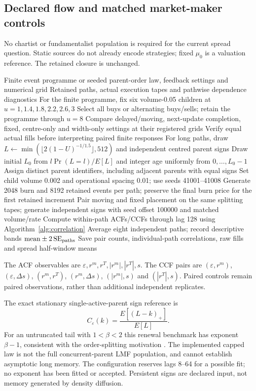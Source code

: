\documentclass[11pt,a4paper]{article}
\begin{document}
\subsection{Declared flow and matched market-maker controls}
No chartist or fundamentalist population is required for the current spread
question. Static sources do not already encode strategies; fixed $\mu_0$
is a valuation reference. The retained closure is unchanged.
\begin{algorithm}[H]
\caption{Declared input flow and common-tape feedback comparisons}\label{alg:controls}
\begin{algorithmic}[1]
\Require Finite event programme or seeded parent-order law, feedback settings and numerical grid
\Ensure Retained paths, actual execution tapes and pathwise dependence diagnostics
\State For the finite programme, fix six volume-0.05 children at $u=1,1.4,1.8,2.2,2.6,3$
\State Select all buys or alternating buys/sells; retain the programme through $u=8$
\State Compare delayed/moving, next-update completion, fixed, centre-only and width-only settings at their registered grids
\State Verify equal actual fills before interpreting paired finite responses
\State For long paths, draw $L\gets\min(\lfloor2(1-U)^{-1/1.5}\rfloor,512)$ and independent centred parent signs
\State Draw initial $L_0$ from $l\Pr(L=l)/E[L]$ and integer age uniformly from $0,\ldots,L_0-1$
\State Assign distinct parent identifiers, including adjacent parents with equal signs
\State Set child volume 0.002 and operational spacing 0.01; use seeds 41001--41008
\State Generate 2048 burn and 8192 retained events per path; preserve the final burn price for the first retained increment
\State Pair moving and fixed placement on the same splitting tapes; generate independent signs with seed offset 100000 and matched volume/rate
\State Compute within-path ACFs/CCFs through lag 128 using Algorithm~\ref{alg:correlation}
\State Average eight independent paths; record descriptive bands $\mathrm{mean}\pm2\,\mathrm{SE}_{\rm paths}$
\State Save pair counts, individual-path correlations, raw fills and spread half-window means
\end{algorithmic}
\end{algorithm}
The ACF observables are $\varepsilon,r^m,r^T,|r^m|,|r^T|,s$. The CCF pairs are $(\varepsilon,r^m)$, $(\varepsilon,\Delta s)$, $(r^m,r^T)$, $(r^m,\Delta s)$, $(|r^m|,s)$ and $(|r^T|,s)$. Paired controls remain paired observations, rather than additional independent replicates.

The exact stationary single-active-parent sign reference is
\[
 C_\varepsilon(k)=\frac{E[(L-k)_+]}{E[L]}.
\]
For an untruncated tail with $1<\beta<2$ this renewal benchmark has exponent
$\beta-1$, consistent with the order-splitting motivation \cite{lmf}.
The implemented capped law is not the full concurrent-parent LMF population,
and cannot establish asymptotic long memory. The configuration reserves
lags 8--64 for a possible fit; no exponent has been fitted or accepted.
Persistent signs are declared input, not memory generated by density diffusion.
\end{document}
